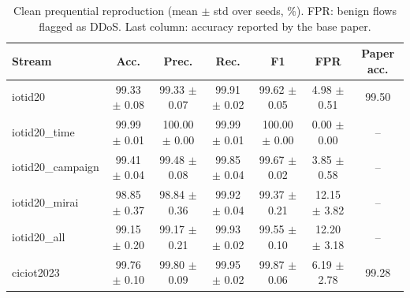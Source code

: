 \begin{table}[t]
\centering
\caption{Clean prequential reproduction (mean $\pm$ std over seeds, \%). FPR: benign flows flagged as DDoS. Last column: accuracy reported by the base paper.}
\label{tab:repro}
\footnotesize
\setlength{\tabcolsep}{3pt}
\begin{tabular}{lcccccc}
\toprule
Stream & Acc. & Prec. & Rec. & F1 & FPR & Paper acc. \\
\midrule
iotid20 & 99.33 $\pm$ 0.08 & 99.33 $\pm$ 0.07 & 99.91 $\pm$ 0.02 & 99.62 $\pm$ 0.05 & 4.98 $\pm$ 0.51 & 99.50 \\
iotid20\_time & 99.99 $\pm$ 0.01 & 100.00 $\pm$ 0.00 & 99.99 $\pm$ 0.01 & 100.00 $\pm$ 0.00 & 0.00 $\pm$ 0.00 & -- \\
iotid20\_campaign & 99.41 $\pm$ 0.04 & 99.48 $\pm$ 0.08 & 99.85 $\pm$ 0.04 & 99.67 $\pm$ 0.02 & 3.85 $\pm$ 0.58 & -- \\
iotid20\_mirai & 98.85 $\pm$ 0.37 & 98.84 $\pm$ 0.36 & 99.92 $\pm$ 0.04 & 99.37 $\pm$ 0.21 & 12.15 $\pm$ 3.82 & -- \\
iotid20\_all & 99.15 $\pm$ 0.20 & 99.17 $\pm$ 0.21 & 99.93 $\pm$ 0.02 & 99.55 $\pm$ 0.10 & 12.20 $\pm$ 3.18 & -- \\
ciciot2023 & 99.76 $\pm$ 0.10 & 99.80 $\pm$ 0.09 & 99.95 $\pm$ 0.02 & 99.87 $\pm$ 0.06 & 6.19 $\pm$ 2.78 & 99.28 \\
\bottomrule
\end{tabular}
\end{table}
